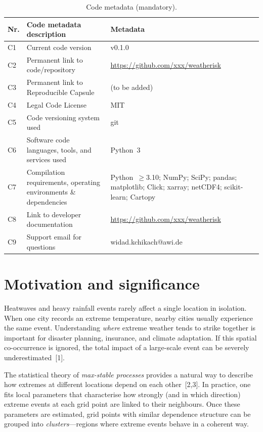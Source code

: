 \documentclass[preprint,12pt,a4paper]{elsarticle}
\begin{document}
\begin{table}[!h]
\begin{tabular}{|l|p{6.5cm}|p{6.5cm}|}
\hline
\textbf{Nr.} & \textbf{Code metadata description} & \textbf{Metadata} \\
\hline
C1 & Current code version & v0.1.0 \\
\hline
C2 & Permanent link to code/repository &
  \url{https://github.com/xxx/weatherisk} \\
\hline
C3 & Permanent link to Reproducible Capsule & (to be added) \\
\hline
C4 & Legal Code License & MIT \\
\hline
C5 & Code versioning system used & git \\
\hline
C6 & Software code languages, tools, and services used & Python~3 \\
\hline
C7 & Compilation requirements, operating environments
  \& dependencies &
  Python~$\geq$3.10; NumPy; SciPy; pandas; matplotlib;
  Click; xarray; netCDF4; scikit-learn; Cartopy \\
\hline
C8 & Link to developer documentation &
  \url{https://github.com/xxx/weatherisk} \\
\hline
C9 & Support email for questions & widad.kchikach@awi.de \\
\hline
\end{tabular}
\caption{Code metadata (mandatory).}
\label{tab:metadata}
\end{table}


\section{Motivation and significance}
\label{sec:motivation}

Heatwaves and heavy rainfall events rarely affect a single location
in isolation.  When one city records an extreme temperature, nearby
cities usually experience the same event.  Understanding \emph{where}
extreme weather tends to strike together is important for disaster
planning, insurance, and climate adaptation.  If this spatial
co-occurrence is ignored, the total impact of a large-scale event
can be severely underestimated~[1].

The statistical theory of \emph{max-stable processes} provides a
natural way to describe how extremes at different locations depend on
each other~[2,3].  In practice, one fits local parameters that
characterise how strongly (and in which direction) extreme events
at each grid point are linked to their neighbours.  Once these
parameters are estimated, grid points with similar dependence
structure can be grouped into \emph{clusters}---regions where
extreme events behave in a coherent way.
\end{document}
